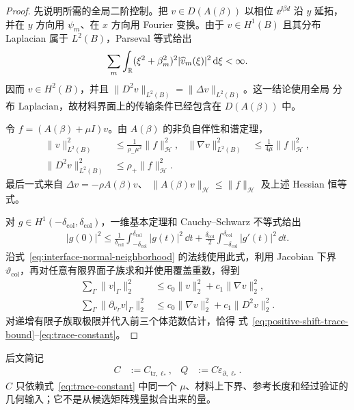 \begin{proof}
  先说明所需的全局二阶控制。把 $v\in D(A(\beta))$ 以相位
  $\ee^{\ii\beta d}$ 沿 $y$ 延拓，并在 $y$ 方向用
  $\psi_m$、在 $x$ 方向用 Fourier 变换。由于 $v\in H^1(B)$ 且其分布 Laplacian 属于
  $L^2(B)$，Parseval 等式给出
  \begin{align*}
    \sum_m\int_{\mathbb{R}}
    (\xi^2+\beta_m^2)^2|\widehat v_m(\xi)|^2\,\mathrm{d}\xi<\infty.
  \end{align*}
  因而 $v\in H^2(B)$，并且
  $\lVert D^2v\rVert_{L^2(B)}=\lVert\Delta v\rVert_{L^2(B)}$。这一结论使用全局
  分布 Laplacian，故材料界面上的传输条件已经包含在 $D(A(\beta))$ 中。

  令 $f=(A(\beta)+\mu I)v$。由 $A(\beta)$ 的非负自伴性和谱定理，
  \begin{align*}
    \lVert v\rVert_{L^2(B)}^2
    &\leq\frac{1}{\rho_-\mu^2}\lVert f\rVert_{\mathcal H}^2,
    &\lVert\nabla v\rVert_{L^2(B)}^2
    &\leq\frac{1}{4\mu}\lVert f\rVert_{\mathcal H}^2,\\
    \lVert D^2v\rVert_{L^2(B)}^2
    &\leq\rho_+\lVert f\rVert_{\mathcal H}^2.
  \end{align*}
  最后一式来自 $\Delta v=-\rho A(\beta)v$、
  $\lVert A(\beta)v\rVert_{\mathcal H}\leq\lVert f\rVert_{\mathcal H}$ 及上述 Hessian
  恒等式。

  对 $g\in H^1(-\delta_{\mathrm{col}},\delta_{\mathrm{col}})$，一维基本定理和
  Cauchy--Schwarz 不等式给出
  \begin{align*}
    |g(0)|^2
    \leq\frac{1}{\delta_{\mathrm{col}}}
      \int_{-\delta_{\mathrm{col}}}^{\delta_{\mathrm{col}}}|g(t)|^2\,\dd t
    +\frac{\delta_{\mathrm{col}}}{2}
      \int_{-\delta_{\mathrm{col}}}^{\delta_{\mathrm{col}}}|g'(t)|^2\,\dd t.
  \end{align*}
  沿式~\eqref{eq:interface-normal-neighborhood} 的法线使用此式，利用 Jacobian 下界
  $\vartheta_{\mathrm{col}}$，再对任意有限界面子族求和并使用覆盖重数，得到
  \begin{align*}
    \sum_\Gamma\lVert v|_\Gamma\rVert_2^2
    &\leq c_0\lVert v\rVert_2^2+c_1\lVert\nabla v\rVert_2^2,\\
    \sum_\Gamma\lVert\partial_{\nu_\Gamma}v|_\Gamma\rVert_2^2
    &\leq c_0\lVert\nabla v\rVert_2^2+c_1\lVert D^2v\rVert_2^2.
  \end{align*}
  对递增有限子族取极限并代入前三个体范数估计，恰得
  式~\eqref{eq:positive-shift-trace-bound}--\eqref{eq:trace-constant}。
\end{proof}

后文简记
\begin{align}
  C&:=C_{\mathrm{tr},\ell_*},
  &Q&:=C\varepsilon_{\partial,\ell_*}.
  \label{eq:trace-defect-product}
\end{align}
$C$ 只依赖式~\eqref{eq:trace-constant} 中同一个 $\mu$、材料上下界、参考长度和经过验证的
几何输入；它不是从候选矩阵残量拟合出来的量。

